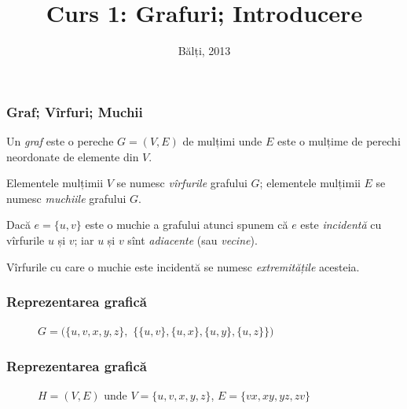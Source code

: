 
\title{Curs 1: Grafuri; Introducere}
\date{Bălți, 2013}



\maketitle

\begin{frame}
  \frametitle{Graf; Vîrfuri; Muchii}

\begin{definition}
Un \emph{graf} este o pereche $G=(V,E)$ de mulțimi unde $E$ este o mulțime de perechi neordonate de elemente din $V$. 
\end{definition}

Elementele mulțimii $V$ se numesc \emph{vîrfurile} grafului $G$; elementele mulțimii $E$ se numesc \emph{muchiile} grafului $G$.

Dacă $e=\{u,v\}$ este o muchie a grafului atunci spunem că $e$ este \emph{incidentă} cu vîrfurile $u$ și $v$; iar $u$ și $v$ sînt \emph{adiacente} (sau \emph{vecine}).

Vîrfurile cu care o muchie este incidentă se numesc \emph{extremitățile} acesteia.

\end{frame}

\begin{frame}
  \frametitle{Reprezentarea grafică}

\begin{figure}
\centering%
\caption{$G=(\{u,v,x,y,z\},$ $\{\{u,v\},\{u,x\},\{u,y\},\{u,z\}\})$}
\end{figure}

\end{frame}

\begin{frame}
  \frametitle{Reprezentarea grafică}

\begin{figure}
\centering%
%
\caption{$H=(V,E)$ unde $V=\{u,v,x,y,z\}$, $E=\{vx,xy,yz,zv\}$}
\end{figure}

\end{frame}

